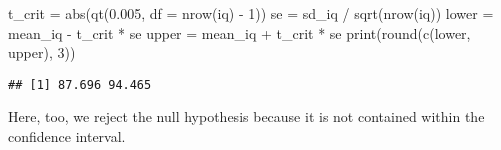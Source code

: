 \documentclass[
]{article}
\newenvironment{Shaded}{\begin{snugshade}}{\end{snugshade}}
\newcommand{\AttributeTok}[1]{\textcolor[rgb]{0.77,0.63,0.00}{#1}}
\newcommand{\DecValTok}[1]{\textcolor[rgb]{0.00,0.00,0.81}{#1}}
\newcommand{\FloatTok}[1]{\textcolor[rgb]{0.00,0.00,0.81}{#1}}
\newcommand{\FunctionTok}[1]{\textcolor[rgb]{0.00,0.00,0.00}{#1}}
\newcommand{\NormalTok}[1]{#1}
\newcommand{\OtherTok}[1]{\textcolor[rgb]{0.56,0.35,0.01}{#1}}
\newcommand{\SpecialCharTok}[1]{\textcolor[rgb]{0.00,0.00,0.00}{#1}}
\begin{document}
\begin{Shaded}
\begin{Highlighting}[]
\NormalTok{t\_crit }\OtherTok{=} \FunctionTok{abs}\NormalTok{(}\FunctionTok{qt}\NormalTok{(}\FloatTok{0.005}\NormalTok{, }\AttributeTok{df =} \FunctionTok{nrow}\NormalTok{(iq) }\SpecialCharTok{{-}} \DecValTok{1}\NormalTok{))}
\NormalTok{se }\OtherTok{=}\NormalTok{ sd\_iq }\SpecialCharTok{/} \FunctionTok{sqrt}\NormalTok{(}\FunctionTok{nrow}\NormalTok{(iq))}
\NormalTok{lower }\OtherTok{=}\NormalTok{ mean\_iq }\SpecialCharTok{{-}}\NormalTok{ t\_crit }\SpecialCharTok{*}\NormalTok{ se}
\NormalTok{upper }\OtherTok{=}\NormalTok{ mean\_iq }\SpecialCharTok{+}\NormalTok{ t\_crit }\SpecialCharTok{*}\NormalTok{ se}
\FunctionTok{print}\NormalTok{(}\FunctionTok{round}\NormalTok{(}\FunctionTok{c}\NormalTok{(lower, upper), }\DecValTok{3}\NormalTok{))}
\end{Highlighting}
\end{Shaded}

\begin{verbatim}
## [1] 87.696 94.465
\end{verbatim}

Here, too, we reject the null hypothesis because it is not contained
within the confidence interval.
\end{document}
